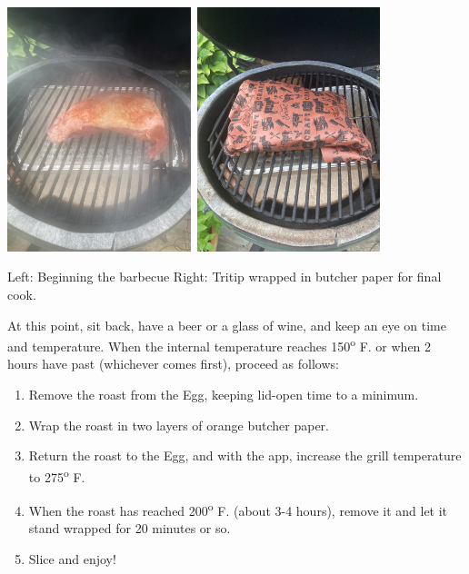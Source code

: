 \documentclass[
]{book}
\providecommand{\tightlist}{%
  \setlength{\itemsep}{0pt}\setlength{\parskip}{0pt}}
\begin{document}
\includegraphics[width=0.4\textwidth,height=\textheight]{images/tritip1.jpeg}~\includegraphics[width=0.4\textwidth,height=\textheight]{images/tritipwrapped.jpeg}

Left: Beginning the barbecue Right: Tritip wrapped in butcher paper for final cook.

At this point, sit back, have a beer or a glass of wine, and keep an eye on time and temperature. When the internal temperature reaches 150\textsuperscript{o} F. or when 2 hours have past (whichever comes first), proceed as follows:

\begin{enumerate}
\def\labelenumi{\arabic{enumi}.}
\tightlist
\item
  Remove the roast from the Egg, keeping lid-open time to a minimum.
\item
  Wrap the roast in two layers of orange butcher paper.
\item
  Return the roast to the Egg, and with the app, increase the grill temperature to 275\textsuperscript{o} F.
\item
  When the roast has reached 200\textsuperscript{o} F. (about 3-4 hours), remove it and let it stand wrapped for 20 minutes or so.
\item
  Slice and enjoy!
\end{enumerate}
\end{document}
